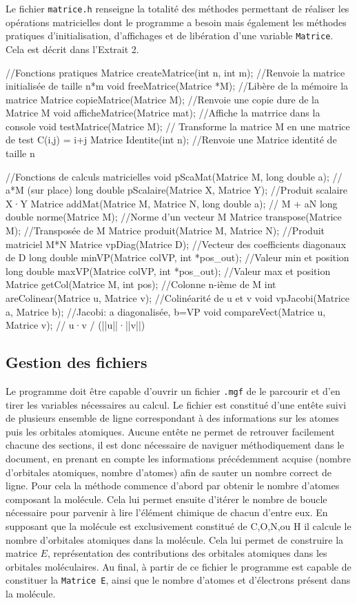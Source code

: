\documentclass[12pt]{article}
\begin{document}
Le fichier \texttt{matrice.h} renseigne la totalité des méthodes permettant de réaliser les opérations matricielles dont le programme a besoin mais également les méthodes pratiques d'initialisation, d'affichages et de libération d'une variable \texttt{Matrice}. Cela est décrit dans l'Extrait 2. 

\begin{C}[H]
//Fonctions pratiques
Matrice createMatrice(int n, int m); //Renvoie la matrice initialisée de taille n*m
void freeMatrice(Matrice *M); //Libère de la mémoire la matrice
Matrice copieMatrice(Matrice M); //Renvoie une copie dure de la Matrice M
void afficheMatrice(Matrice mat); //Affiche la matrrice dans la console
void testMatrice(Matrice M); // Transforme la matrice M en une matrice de test C(i,j) = i+j
Matrice Identite(int n); //Renvoie une Matrice identité de taille n

//Fonctions de calculs matricielles
void pScaMat(Matrice M, long double a); // a*M (sur place)
long double pScalaire(Matrice X, Matrice Y); //Produit scalaire X·Y
Matrice addMat(Matrice M, Matrice N, long double a); // M + aN
long double norme(Matrice M); //Norme d'un vecteur M
Matrice transpose(Matrice M); //Transposée de M
Matrice produit(Matrice M, Matrice N); //Produit matriciel M*N
Matrice vpDiag(Matrice D); //Vecteur des coefficients diagonaux de D
long double minVP(Matrice colVP, int *pos_out); //Valeur min et position
long double maxVP(Matrice colVP, int *pos_out); //Valeur max et position
Matrice getCol(Matrice M, int pos); //Colonne n-ième de M
int areColinear(Matrice u, Matrice v); //Colinéarité de u et v
void vpJacobi(Matrice a, Matrice b); //Jacobi: a diagonalisée, b=VP
void compareVect(Matrice u, Matrice v); // u·v / (||u||·||v||)
\end{C}

\subsection{Gestion des fichiers}
Le programme doit être capable d'ouvrir un fichier \texttt{.mgf} de le parcourir et d'en tirer les variables nécessaires au calcul. Le fichier est constitué d'une entête suivi de plusieurs ensemble de ligne correspondant à des informations sur les atomes puis les orbitales atomiques. Aucune entête ne permet de retrouver facilement chacune des sections, il est donc nécessaire de naviguer méthodiquement dans le document, en prenant en compte les informations précédemment acquise (nombre d'orbitales atomiques, nombre d'atomes) afin de sauter un nombre correct de ligne. Pour cela la méthode commence d'abord par obtenir le nombre d'atomes composant la molécule. Cela lui permet ensuite d'itérer le nombre de boucle nécessaire pour parvenir à lire l'élément chimique de chacun d'entre eux. En supposant que la molécule est exclusivement constitué de C,O,N,ou H il calcule le nombre d'orbitales atomiques dans la molécule. Cela lui permet de construire la matrice $E$, représentation des contributions des orbitales atomiques dans les orbitales moléculaires.
Au final, à partir de ce fichier le programme est capable de constituer la \texttt{Matrice E}, ainsi que le nombre d'atomes et d'électrons présent dans la molécule.
\end{document}
